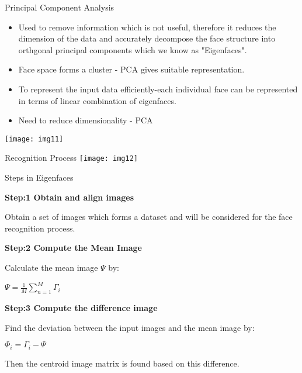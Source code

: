 \documentclass{beamer}
\newcommand\myheading[1]{%
  \par\bigskip
  {\large\bfseries#1}\par\smallskip}
\begin{document}
\begin{frame}{Principal Component Analysis}
\begin{flushleft}
	\begin{itemize}
		\item Used to remove information which is not useful, therefore it reduces the dimension of the data and accurately decompose the face structure into orthgonal principal components which we know as "Eigenfaces".
		\item Face space forms a cluster - PCA gives suitable representation.
		\item To represent the input data efficiently-each individual face can be represented in terms of linear combination of eigenfaces.
		\item Need to reduce dimensionality - PCA
	\end{itemize}
\end{flushleft}
\texttt{[image: img11]}
\end{frame}

\begin{frame}{Recognition Process}
	\texttt{[image: img12]}
\end{frame}

\begin{frame}{Steps in Eigenfaces}
	\begin{flushleft}
		\myheading{Step:1 Obtain and align images}
		Obtain a set of images which forms a dataset and will be considered for the face recognition process.
		\myheading{Step:2 Compute the Mean Image}
		Calculate the mean image $\Psi$ by:
	\end{flushleft}
		$ \Psi = \frac{1}{M} \sum_{n=1}^{M}\Gamma_i$
	\begin{flushleft}
		\myheading{Step:3 Compute the difference image}
		Find the deviation between the input images and the mean image by:
	\end{flushleft}
		$ \Phi_i = \Gamma_i - \Psi $
	\begin{flushleft}
		Then the centroid image matrix is found based on this difference.
	\end{flushleft}
\end{frame}
\end{document}
